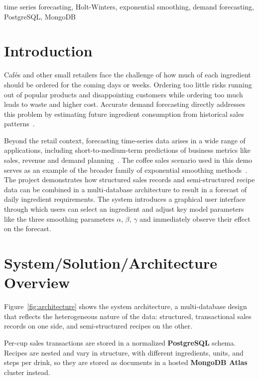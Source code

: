\documentclass[conference]{IEEEtran}
\begin{document}
\begin{IEEEkeywords}
time series forecasting, Holt-Winters, exponential smoothing, demand forecasting, PostgreSQL, MongoDB
\end{IEEEkeywords}

\section{Introduction}
Cafés and other small retailers face the challenge of how much of
each ingredient should be ordered for the coming days or weeks. Ordering too
little risks running out of popular products and disappointing
customers while ordering too much leads to waste and higher cost.
Accurate demand forecasting directly addresses this problem by
estimating future ingredient consumption from historical sales patterns~\cite{hyndman2018forecasting}.

Beyond the retail context, forecasting time-series data arises in a
wide range of applications, including short-to-medium-term predictions of business metrics like sales, revenue and demand planning~\cite{holt2004}. The coffee sales scenario used in this demo
serves as an example of the broader family of exponential smoothing methods~\cite{gardner1985exponential}. The project demonstrates how structured sales records and
semi-structured recipe data can be combined in a multi-database
architecture to result in a forecast of daily ingredient
requirements. The system introduces a graphical user interface through which
users can select an ingredient and adjust key model parameters like the three smoothing parameters $\alpha$, $\beta$, $\gamma$ and immediately observe their
effect on the forecast.

\section{System/Solution/Architecture Overview}
\label{sec:architecture}

Figure~\ref{fig:architecture} shows the system architecture, a multi-database design that reflects the heterogeneous nature of the data: structured, transactional sales records on one side, and semi-structured recipes on the other.

Per-cup sales transactions are stored in a normalized \textbf{PostgreSQL} schema. Recipes are nested and vary in structure, with different ingredients, units, and steps per drink, so they are stored as documents in a hosted \textbf{MongoDB Atlas} cluster instead.
\end{document}

